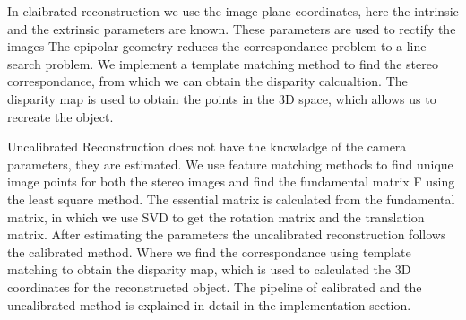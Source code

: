 In claibrated reconstruction we use the image plane coordinates, here the intrinsic and the extrinsic parameters are known. These parameters are used to rectify the images The epipolar geometry reduces the correspondance problem to a line search problem. We implement a template matching method to find the stereo correspondance, from which we can obtain the disparity calcualtion. The disparity map is used to obtain the points in the 3D space, which allows us to recreate the object. 

Uncalibrated Reconstruction does not have the knowladge of the camera parameters, they are estimated. We use feature matching methods to find unique image points for both the stereo images and find the fundamental matrix F using the least square method. The essential matrix is calculated from the fundamental matrix, in which we use SVD to get the rotation matrix and the translation matrix. After estimating the parameters the uncalibrated reconstruction follows the calibrated method. Where we find the correspondance using template matching to obtain the disparity map, which is used to calculated the 3D coordinates for the reconstructed object. The pipeline of calibrated and the uncalibrated method is explained in detail in the implementation section.
